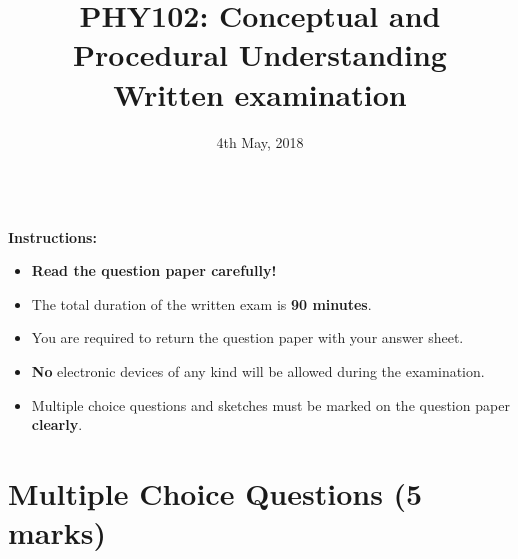 \title{\vspace{-2cm} PHY102: Conceptual and Procedural Understanding\\\vspace{0.25cm} {Written examination}}
\author{}
\date{\vspace{-2cm} 4th May, 2018}

\maketitle
\vspace{-1.5cm}
\begin{center}
\hrulefill\\
\textbf{Instructions:}

\begin{itemize}
\item \textbf{Read the question paper carefully!}
\item The total duration of the written exam is \textbf{90 minutes}.
\item You are required to return the question paper with your answer sheet.
\item \textbf{No} electronic devices of any kind will be allowed during the examination.
\item Multiple choice questions and sketches must be marked on the question paper \textbf{clearly}.
\end{itemize}
\vspace{-0.9cm}
\hrulefill
\end{center}
\vspace{-0.9cm}
\section*{Multiple Choice Questions \hfill (5 marks)}

